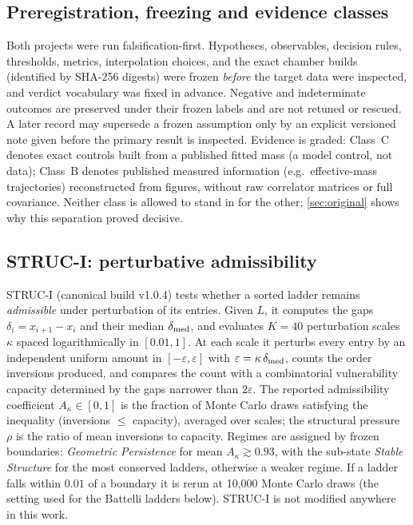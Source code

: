 \documentclass[11pt,a4paper]{article}
\theoremstyle{definition}
\theoremstyle{remark}
\begin{document}
\subsection{Preregistration, freezing and evidence classes}
Both projects were run falsification-first. Hypotheses, observables, decision rules, thresholds, metrics, interpolation choices, and the exact chamber builds (identified by SHA-256 digests) were frozen \emph{before} the target data were inspected, and verdict vocabulary was fixed in advance. Negative and indeterminate outcomes are preserved under their frozen labels and are not retuned or rescued. A later record may supersede a frozen assumption only by an explicit versioned note given before the primary result is inspected. Evidence is graded: Class~C denotes exact controls built from a published fitted mass (a model control, not data); Class~B denotes published measured information (e.g.\ effective-mass trajectories) reconstructed from figures, without raw correlator matrices or full covariance. Neither class is allowed to stand in for the other; \cref{sec:original} shows why this separation proved decisive.

\subsection{STRUC-I: perturbative admissibility}\label{ssec:struci}
STRUC-I (canonical build v1.0.4) tests whether a sorted ladder remains \emph{admissible} under perturbation of its entries. Given $L$, it computes the gaps $\delta_i=x_{i+1}-x_i$ and their median $\delta_{\rm med}$, and evaluates $K=40$ perturbation scales $\kappa$ spaced logarithmically in $[0.01,1]$. At each scale it perturbs every entry by an independent uniform amount in $[-\varepsilon,\varepsilon]$ with $\varepsilon=\kappa\,\delta_{\rm med}$, counts the order inversions produced, and compares the count with a combinatorial vulnerability capacity determined by the gaps narrower than $2\varepsilon$. The reported admissibility coefficient $A_\kappa\in[0,1]$ is the fraction of Monte Carlo draws satisfying the inequality (inversions $\le$ capacity), averaged over scales; the structural pressure $\rho$ is the ratio of mean inversions to capacity. Regimes are assigned by frozen boundaries: \emph{Geometric Persistence} for mean $A_\kappa\gtrsim0.93$, with the sub-state \emph{Stable Structure} for the most conserved ladders, otherwise a weaker regime. If a ladder falls within $0.01$ of a boundary it is rerun at 10{,}000 Monte Carlo draws (the setting used for the Battelli ladders below). STRUC-I is not modified anywhere in this work.
\end{document}
